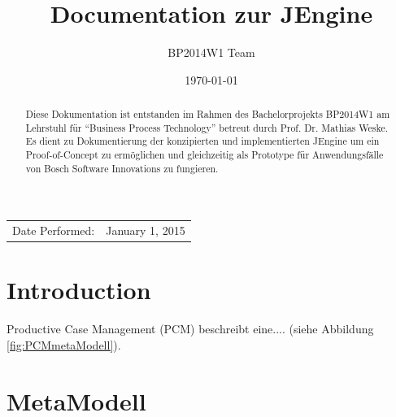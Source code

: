 \documentclass{article}
\title{Documentation zur JEngine} %
\author{BP2014W1 Team} %
\date{\today} %
\begin{document}
\maketitle %

\begin{center}
\begin{tabular}{l r}
Date Performed: & January 1, 2015 \\ %
\end{tabular}
\end{center}


\begin{abstract}
Diese Dokumentation ist entstanden im Rahmen des Bachelorprojekts BP2014W1 am Lehrstuhl für ``Business Process Technology'' betreut durch Prof. Dr. Mathias Weske. Es dient zu Dokumentierung der konzipierten und implementierten JEngine um ein Proof-of-Concept zu ermöglichen und gleichzeitig als Prototype für Anwendungsfälle von Bosch Software Innovations zu fungieren.
\end{abstract}




%
%
\section{Introduction}
Productive Case Management (PCM) beschreibt eine.... \cite{ImplementationFrameworkPCM} (siehe Abbildung \ref{fig:PCMmetaModell}).

%
%
\section{MetaModell}
\end{document}

